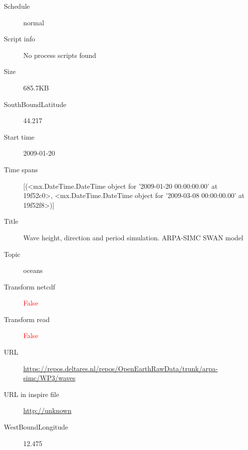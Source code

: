\documentclass[9]{report}
\begin{document}
\begin{description}
\begin{verbatim}
\end{verbatim}
  \item[Schedule] normal
  \item[Script info] No process scripts found
  \item[Size] 685.7KB
  \item[SouthBoundLatitude] 44.217
  \item[Start time] 2009-01-20
  \item[Time spans] [(<mx.DateTime.DateTime object for '2009-01-20 00:00:00.00' at 19f52c0>, <mx.DateTime.DateTime object for '2009-03-08 00:00:00.00' at 19f52f8>)]
  \item[Title]  Wave height, direction and period simulation. ARPA-SIMC SWAN model 
  \item[Topic] oceans
  \item[Transform netcdf] \textcolor{red}{False}
  \item[Transform read] \textcolor{red}{False}
  \item[URL] \href{https://repos.deltares.nl/repos/OpenEarthRawData/trunk/arpa-simc/WP3/waves}{https://repos.deltares.nl/repos/OpenEarthRawData/trunk/arpa-simc/WP3/waves}
  \item[URL in inspire file] \href{http://unknown}{http://unknown}
  \item[WestBoundLongitude] 12.475
\end{description}
\end{document}
